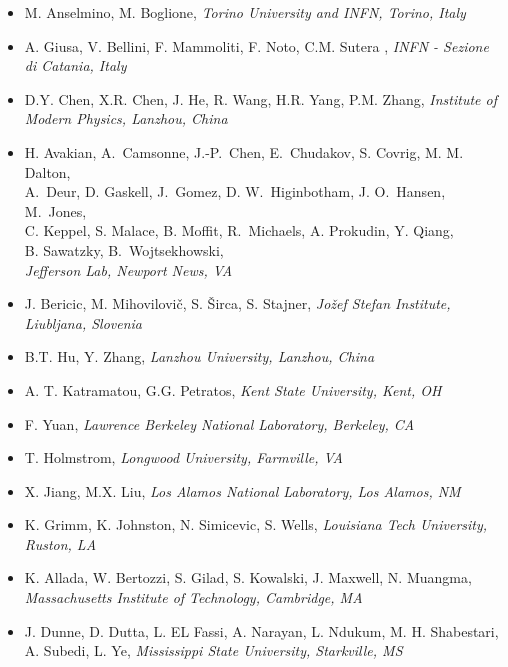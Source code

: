 \begin{itemize}
\item M. Anselmino, M. Boglione,  
\emph{Torino University and INFN, Torino, Italy}
 
\item A. Giusa, V. Bellini, F. Mammoliti, F. Noto, C.M. Sutera , 
\emph{INFN - Sezione di Catania, Italy}
 
\item D.Y. Chen, X.R. Chen, J. He, R. Wang, H.R. Yang, P.M. Zhang, 
\emph{Institute of Modern Physics, Lanzhou, China}
  
\item H. Avakian, A.~Camsonne, J.-P.~Chen, E.~Chudakov, S. Covrig, M. M. Dalton, \\
A.~Deur, D. Gaskell, J.~Gomez,  D. W.~Higinbotham, J. O.~Hansen, M.~Jones, \\
C. Keppel, S. Malace, B. Moffit, R.~Michaels, A. Prokudin, Y. Qiang, \\
B. Sawatzky,  B.~Wojtsekhowski,  \\
\emph{Jefferson Lab, Newport News, VA}
  
\item J. Bericic, M. Mihovilovi\v{c}, S. \v{S}irca, S. Stajner,
\emph{Jo\v{z}ef Stefan Institute, Liubljana, Slovenia}
 
\item B.T. Hu, Y. Zhang, 
\emph{Lanzhou University, Lanzhou, China}
  
\item A. T. Katramatou, G.G. Petratos, 
\emph{Kent State University, Kent, OH}
  
\item F. Yuan,  
\emph{Lawrence Berkeley National Laboratory, Berkeley, CA}
 
\item T. Holmstrom, 
\emph{Longwood University, Farmville, VA}
 
 
\item X. Jiang, M.X. Liu, 
\emph{Los Alamos National Laboratory, Los Alamos, NM}
  
\item K. Grimm, K. Johnston, N. Simicevic, S. Wells, 
\emph{Louisiana Tech University, Ruston, LA}
  
\item K. Allada, W. Bertozzi, S. Gilad, S. Kowalski, J. Maxwell, N. Muangma, 
\emph{Massachusetts Institute of Technology, Cambridge, MA}  
  
\item J. Dunne, D. Dutta, L. EL Fassi, A. Narayan, L. Ndukum, M. H. Shabestari, A. Subedi, L. Ye,   
\emph{Mississippi State University, Starkville, MS}  
 

\end{itemize}
